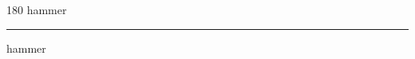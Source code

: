 
\begin{frame}
\begin{center}
\begin{turn}{180}
{\fontsize{2.5cm}{1em}\selectfont hammer}
\end{turn}
\vspace{1em}\par  
\hrule
\vspace{1em}\par  
{\fontsize{2.5cm}{1em}\selectfont hammer}
\end{center}
\end{frame}
